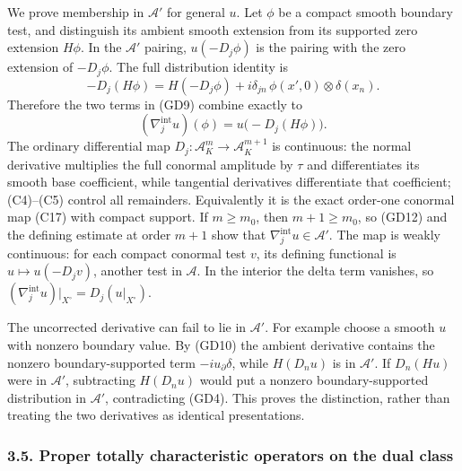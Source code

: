 \documentclass[
  11pt,
]{article}
\begin{document}
We prove membership in \(\mathcal A'\) for general \(u\). Let \(\phi\)
be a compact smooth boundary test, and distinguish its ambient smooth
extension from its supported zero extension \(H\phi\). In the
\(\mathcal A'\) pairing, \(u(-D_j\phi)\) is the pairing with the zero
extension of \(-D_j\phi\). The full distribution identity is \[
 -D_j(H\phi)
     =H(-D_j\phi)+i\delta_{jn}\,
                         \phi(x',0)\otimes\delta(x_n).
 \tag{GD11}
\] Therefore the two terms in (GD9) combine exactly to \[
 (\nabla_j^\mathrm{int}u)(\phi)
   =u\bigl(-D_j(H\phi)\bigr).
 \tag{GD12}
\] The ordinary differential map
\(D_j:\mathcal A^m_K\to\mathcal A^{m+1}_{K}\) is continuous: the normal
derivative multiplies the full conormal amplitude by \(\tau\) and
differentiates its smooth base coefficient, while tangential derivatives
differentiate that coefficient; (C4)--(C5) control all remainders.
Equivalently it is the exact order-one conormal map (C17) with compact
support. If \(m\ge m_0\), then \(m+1\ge m_0\), so (GD12) and the
defining estimate at order \(m+1\) show that
\(\nabla_j^\mathrm{int}u\in\mathcal A'\). The map is weakly continuous:
for each compact conormal test \(v\), its defining functional is
\(u\mapsto u(-D_jv)\), another test in \(\mathcal A\). In the interior
the delta term vanishes, so
\((\nabla_j^\mathrm{int}u)|_{X^\circ}=D_j(u|_{X^\circ})\).

The uncorrected derivative can fail to lie in \(\mathcal A'\). For
example choose a smooth \(u\) with nonzero boundary value. By (GD10) the
ambient derivative contains the nonzero boundary-supported term
\(-i u_\partial\delta\), while \(H(D_nu)\) is in \(\mathcal A'\). If
\(D_n(Hu)\) were in \(\mathcal A'\), subtracting \(H(D_nu)\) would put a
nonzero boundary-supported distribution in \(\mathcal A'\),
contradicting (GD4). This proves the distinction, rather than treating
the two derivatives as identical presentations.

\subsubsection{3.5. Proper totally characteristic operators on the dual
class}\label{proper-totally-characteristic-operators-on-the-dual-class}
\end{document}
